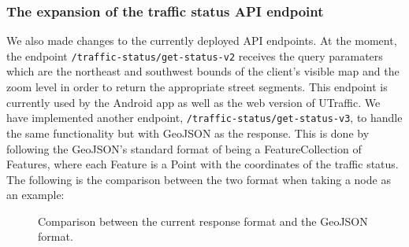 \subsubsection{The expansion of the traffic status API endpoint}
We also made changes to the currently deployed API endpoints. At the moment, the endpoint \lstinline{/traffic-status/get-status-v2} receives the query paramaters which are the northeast and southwest bounds of the client's visible map and the zoom level in order to return the appropriate street segments. This endpoint is currently used by the Android app as well as the web version of UTraffic. We have implemented another endpoint, \lstinline{/traffic-status/get-status-v3}, to handle the same functionality but with GeoJSON as the response. This is done by following the GeoJSON's standard format of being a FeatureCollection of Features, where each Feature is a Point with the coordinates of the traffic status. The following is the comparison between the two format when taking a node as an example:

\begin{figure}[H]
    \centering
    \hspace{0.5cm} %
    \caption{Comparison between the current response format and the GeoJSON format.}
\end{figure}

